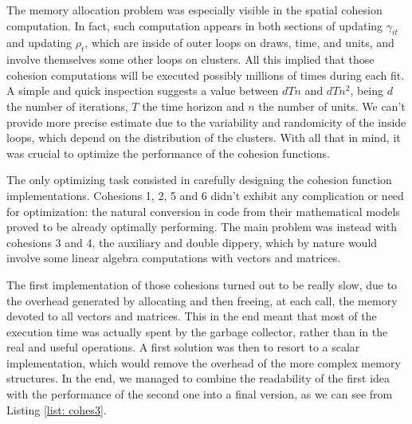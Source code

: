 \documentclass[12pt,	%
	a4paper,		%
	twoside,		%
	openright,		%
	titlepage,%
	]{book}
\theoremstyle{definition}
\begin{document}
The memory allocation problem was especially visible in the spatial cohesion computation. In fact, such computation appears in both sections of updating $\gamma_{it}$ and updating $\rho_t$, which are inside of outer loops on draws, time, and units, and involve themselves some other loops on clusters. All this implied that those cohesion computations will be executed possibly millions of times during each fit. A simple and quick inspection suggests a value between $dTn$ and $dTn^2$, being $d$ the number of iterations, $T$ the time horizon and $n$ the number of units. We can't provide more precise estimate due to the variability and randomicity of the inside loops, which depend on the distribution of the clusters. With all that in mind, it was crucial to optimize the performance of the cohesion functions.

The only optimizing task consisted in carefully designing the cohesion function implementations. Cohesions 1, 2, 5 and 6 didn't exhibit any complication or need for optimization: the natural conversion in code from their mathematical models proved to be already optimally performing. The main problem was instead with cohesions 3 and 4, the auxiliary and double dippery, which by nature would involve some linear algebra computations with vectors and matrices. 

The first implementation of those cohesions turned out to be really slow, due to the overhead generated by allocating and then freeing, at each call, the memory devoted to all vectors and matrices. This in the end meant that most of the execution time was actually spent by the garbage collector, rather than in the real and useful operations. A first solution was then to resort to a scalar implementation, which would remove the overhead of the more complex memory structures. In the end, we managed to combine the readability of the first idea with the performance of the second one into a final version, as we can see from Listing \ref{list: cohes3}.
\end{document}

